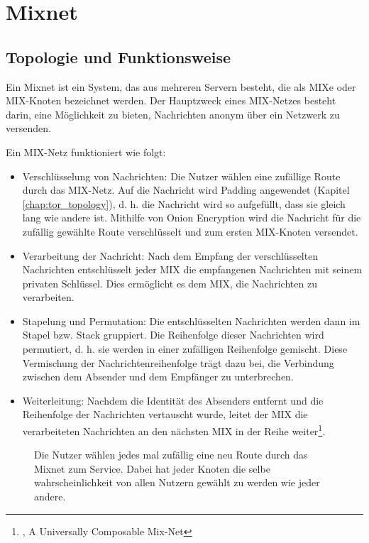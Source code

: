 \section{Mixnet}
\label{chap:mixnet}

\subsection{Topologie und Funktionsweise}
\label{chap:mixnet_topology}

Ein Mixnet ist ein System, das aus mehreren Servern besteht, die als MIXe oder MIX-Knoten bezeichnet werden.  Der Hauptzweck eines MIX-Netzes besteht darin, eine Möglichkeit zu bieten, Nachrichten anonym über ein Netzwerk zu versenden.

Ein MIX-Netz funktioniert wie folgt:

\begin{itemize}
    \item Verschlüsselung von Nachrichten: Die Nutzer wählen eine zufällige Route durch das MIX-Netz. Auf die Nachricht wird Padding angewendet (Kapitel \ref{chap:tor_topology}), d. h. die Nachricht wird so aufgefüllt, dass sie gleich lang wie andere ist. Mithilfe von Onion Encryption wird die Nachricht für die zufällig gewählte Route verschlüsselt und zum ersten MIX-Knoten versendet.
    \item Verarbeitung der Nachricht: Nach dem Empfang der verschlüsselten Nachrichten entschlüsselt jeder MIX die empfangenen Nachrichten mit seinem privaten Schlüssel. Dies ermöglicht es dem MIX, die Nachrichten zu verarbeiten.
    \item Stapelung und Permutation: Die entschlüsselten Nachrichten werden dann im Stapel bzw. Stack gruppiert. Die Reihenfolge dieser Nachrichten wird permutiert, d. h. sie werden in einer zufälligen Reihenfolge gemischt. Diese Vermischung der Nachrichtenreihenfolge trägt dazu bei, die Verbindung zwischen dem Absender und dem Empfänger zu unterbrechen.
    \item Weiterleitung: Nachdem die Identität des Absenders entfernt und die Reihenfolge der Nachrichten vertauscht wurde, leitet der MIX die verarbeiteten Nachrichten an den nächsten MIX in der Reihe weiter\footnote{\cite{ComposableMixNet}, A Universally Composable Mix-Net}.
\end{itemize}

\begin{figure}[h!]
    \centering
    
    \caption{Die Nutzer wählen jedes mal zufällig eine neu Route durch das Mixnet zum Service. Dabei hat jeder Knoten die selbe wahrscheinlichkeit von allen Nutzern gewählt zu werden wie jeder andere.}
    \label{imgs:mixnet}
\end{figure}

